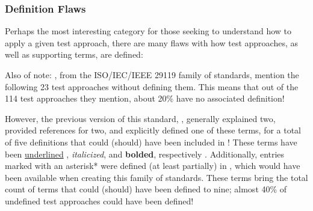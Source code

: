 \ifnotpaper
    \begin{landscape}
        
    \end{landscape}
\else %
\fi

\subsubsection{Definition Flaws}\label{defs}

Perhaps the most interesting category for those seeking to understand how to
apply a given test approach, there are many flaws with how test
approaches, as well as supporting terms, are defined:



\ifnotpaper
    Also of note: \citep{IEEE2022, IEEE2021}, from the
    ISO/IEC/IEEE 29119 family of standards, mention the following 23 test
    approaches without defining them. This means that out of the 114 test
    approaches they mention, about 20\% have no associated definition!

    However, the previous version of this standard, \citeyearpar{IEEE2013},
    generally explained two, provided references for two, and explicitly defined
    one of these terms, for a total of five definitions that could (should) have
    been included in \citeyearpar{IEEE2022}! These terms have been
    \underline{underlined}\ifnotpaper%
        , \emph{italicized}, and \textbf{bolded}, respectively%
    \fi. Additionally, entries marked with an asterisk* were defined (at least
    partially) in \citeyearpar{IEEE2017}, which would have been available when
    creating this family of standards. These terms bring the total count of terms
    that could (should) have been defined to nine; almost 40\% of undefined test
    approaches could have been defined!

